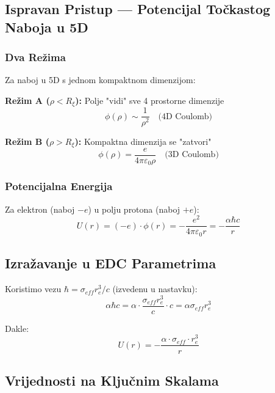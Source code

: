 \documentclass[12pt,a4paper]{article}
\begin{document}
\subsection{Ispravan Pristup — Potencijal Točkastog Naboja u 5D}

\subsubsection{Dva Režima}

Za naboj u 5D s jednom kompaktnom dimenzijom:

\textbf{Režim A ($\rho < R_\xi$):} Polje "vidi" sve 4 prostorne dimenzije
\begin{equation}
\phi(\rho) \sim \frac{1}{\rho^2} \quad \text{(4D Coulomb)}
\end{equation}

\textbf{Režim B ($\rho > R_\xi$):} Kompaktna dimenzija se "zatvori"
\begin{equation}
\phi(\rho) = \frac{e}{4\pi\varepsilon_0 \rho} \quad \text{(3D Coulomb)}
\end{equation}

\subsubsection{Potencijalna Energija}

Za elektron (naboj $-e$) u polju protona (naboj $+e$):
\begin{equation}
U(r) = (-e) \cdot \phi(r) = -\frac{e^2}{4\pi\varepsilon_0 r} = -\frac{\alpha \hbar c}{r}
\end{equation}

\subsection{Izražavanje u EDC Parametrima}

Koristimo vezu $\hbar = \sigma_{eff} r_e^3 / c$ (izvedenu u nastavku):
\begin{equation}
\alpha \hbar c = \alpha \cdot \frac{\sigma_{eff} r_e^3}{c} \cdot c = \alpha \sigma_{eff} r_e^3
\end{equation}

Dakle:
\begin{equation}
\boxed{U(r) = -\frac{\alpha \cdot \sigma_{eff} \cdot r_e^3}{r}}
\end{equation}

\subsection{Vrijednosti na Ključnim Skalama}
\end{document}
